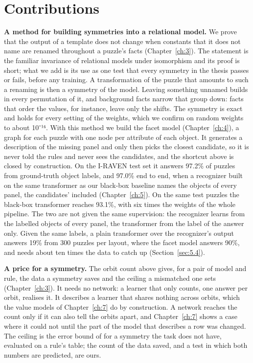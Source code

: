 \section{Contributions}\label{sec:1.3}

\textbf{A method for building symmetries into a relational model.} We prove that the output of a template does not change when constants that it does not name are renamed throughout a puzzle's facts (Chapter~\ref{ch:3}). The statement is the familiar invariance of relational models under isomorphism and its proof is short; what we add is its use as one test that every symmetry in the thesis passes or fails, before any training. A transformation of the puzzle that amounts to such a renaming is then a symmetry of the model. Leaving something unnamed builds in every permutation of it, and background facts narrow that group down: facts that order the values, for instance, leave only the shifts. The symmetry is exact and holds for every setting of the weights, which we confirm on random weights to about 10⁻¹⁶. With this method we build the facet model (Chapter~\ref{ch:4}), a graph for each puzzle with one node per attribute of each object. It generates a description of the missing panel and only then picks the closest candidate, so it is never told the rules and never sees the candidates, and the shortcut above is closed by construction. On the I-RAVEN test set it answers 97.2\% of puzzles from ground-truth object labels, and 97.0\% end to end, when a recognizer built on the same transformer as our black-box baseline names the objects of every panel, the candidates' included (Chapter~\ref{ch:5}). On the same test puzzles the black-box transformer reaches 93.1\%, with six times the weights of the whole pipeline. The two are not given the same supervision: the recognizer learns from the labelled objects of every panel, the transformer from the label of the answer only. Given the same labels, a plain transformer over the recognizer's output answers 19\% from 300 puzzles per layout, where the facet model answers 90\%, and needs about ten times the data to catch up (Section~\ref{sec:5.4}).

\textbf{A price for a symmetry.} The orbit count above gives, for a pair of model and rule, the data a symmetry saves and the ceiling a mismatched one sets (Chapter~\ref{ch:3}). It needs no network: a learner that only counts, one answer per orbit, realises it. It describes a learner that shares nothing across orbits, which the value models of Chapter~\ref{ch:7} do by construction. A network reaches the count only if it can also tell the orbits apart, and Chapter~\ref{ch:7} shows a case where it could not until the part of the model that describes a row was changed. The ceiling is the error bound of \citet[Theorem 4.3]{wang2023general} for a symmetry the task does not have, evaluated on a rule's table; the count of the data saved, and a test in which both numbers are predicted, are ours.

